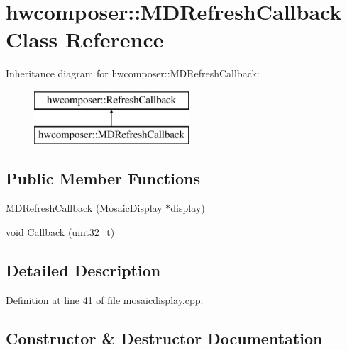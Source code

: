 \hypertarget{classhwcomposer_1_1MDRefreshCallback}{}\section{hwcomposer\+:\+:M\+D\+Refresh\+Callback Class Reference}
\label{classhwcomposer_1_1MDRefreshCallback}
Inheritance diagram for hwcomposer\+:\+:M\+D\+Refresh\+Callback\+:\begin{figure}[H]
\begin{center}
\leavevmode
\includegraphics[height=2.000000cm]{classhwcomposer_1_1MDRefreshCallback}
\end{center}
\end{figure}
\subsection*{Public Member Functions}
\begin{DoxyCompactItemize}
\item 
\mbox{\hyperlink{classhwcomposer_1_1MDRefreshCallback_ace557bde20b0df08cadc970bf975acd0}{M\+D\+Refresh\+Callback}} (\mbox{\hyperlink{classhwcomposer_1_1MosaicDisplay}{Mosaic\+Display}} $\ast$display)
\item 
void \mbox{\hyperlink{classhwcomposer_1_1MDRefreshCallback_a398cbe9e48e0b40eb73588d772da6833}{Callback}} (uint32\+\_\+t)
\end{DoxyCompactItemize}


\subsection{Detailed Description}


Definition at line 41 of file mosaicdisplay.\+cpp.



\subsection{Constructor \& Destructor Documentation}
\mbox{\label{classhwcomposer_1_1MDRefreshCallback_ace557bde20b0df08cadc970bf975acd0}} 

